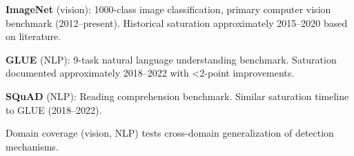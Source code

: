 
\textbf{ImageNet} (vision): 1000-class image classification, primary computer vision benchmark (2012--present). Historical saturation approximately 2015--2020 based on literature.

\textbf{GLUE} (NLP): 9-task natural language understanding benchmark. Saturation documented approximately 2018--2022 with <2-point improvements.

\textbf{SQuAD} (NLP): Reading comprehension benchmark. Similar saturation timeline to GLUE (2018--2022).

Domain coverage (vision, NLP) tests cross-domain generalization of detection mechanisms.
